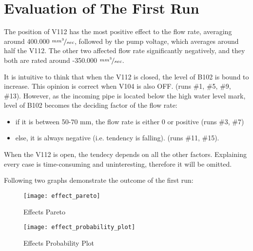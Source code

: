 \newpage
\section{Evaluation of The First Run}

The position of V112 has the most positive effect to the flow rate, averaging around 400.000 $\nicefrac{mm^3}{sec}$, followed by the pump voltage, which averages around half the V112. The other two affected flow rate significantly negatively, and they both are rated around -350.000 $\nicefrac{mm^3}{sec}$.

It is intuitive to think that when the V112 is closed, the level of B102 is bound to increase. This opinion is correct when V104 is also OFF. (runs \#1, \#5, \#9, \#13). However, as the incoming pipe is located below the high water level mark, level of B102 becomes the deciding factor of the flow rate:

\begin{itemize}[noitemsep, topsep=0pt]
\item if it is between 50-70 mm, the flow rate is either 0 or positive (runs \#3, \#7)
\item else, it is always negative (i.e. tendency is falling). (runs \#11, \#15).
\end{itemize}

When the V112 is open, the tendecy depends on all the other factors. Explaining every case is time-consuming and uninteresting, therefore it will be omitted.

Following two graphs demonstrate the outcome of the first run:

\begin{figure}[h]
	\begin{center}
		\texttt{[image: effect\_pareto]}
	\end{center}
	\caption{Effects Pareto}
\end{figure}

\begin{figure}[h]
	\begin{center}
		\texttt{[image: effect\_probability\_plot]}
	\end{center}
	\caption{Effects Probability Plot}
\end{figure}

